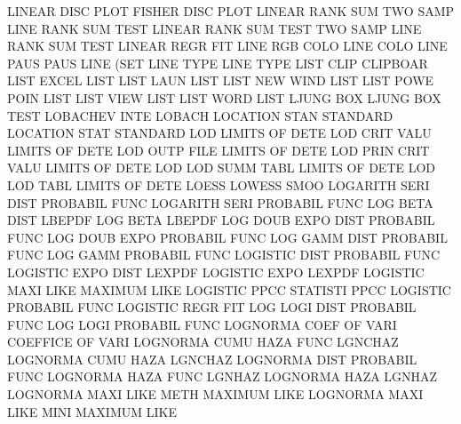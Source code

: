 LINEAR   DISC PLOT                      FISHER   DISC PLOT
LINEAR   RANK SUM                       TWO      SAMP LINE RANK SUM  TEST
LINEAR   RANK SUM  TEST                 TWO      SAMP LINE RANK SUM  TEST
LINEAR   REGR                           FIT
LINE     RGB  COLO                      LINE     COLO
LINE     PAUS                           PAUS     LINE (SET
LINE     TYPE                           LINE     TYPE
LIST     CLIP                           CLIPBOAR
LIST     EXCEL                          LIST
LIST     LAUN                           LIST
LIST     NEW  WIND                      LIST
LIST     POWE POIN                      LIST
LIST     VIEW                           LIST
LIST     WORD                           LIST
LJUNG    BOX                            LJUNG    BOX  TEST
LOBACHEV INTE                           LOBACH
LOCATION STAN                           STANDARD
LOCATION STAT                           STANDARD
LOD                                     LIMITS   OF   DETE
LOD      CRIT VALU                      LIMITS   OF   DETE
LOD      OUTP FILE                      LIMITS   OF   DETE
LOD      PRIN CRIT VALU                 LIMITS   OF   DETE
LOD      LOD  SUMM TABL                 LIMITS   OF   DETE
LOD      LOD  TABL                      LIMITS   OF   DETE
LOESS                                   LOWESS   SMOO
LOGARITH SERI DIST                      PROBABIL FUNC
LOGARITH SERI                           PROBABIL FUNC
LOG      BETA DIST                      LBEPDF
LOG      BETA                           LBEPDF
LOG      DOUB EXPO DIST                 PROBABIL FUNC
LOG      DOUB EXPO                      PROBABIL FUNC
LOG      GAMM DIST                      PROBABIL FUNC
LOG      GAMM                           PROBABIL FUNC
LOGISTIC DIST                           PROBABIL FUNC
LOGISTIC EXPO DIST                      LEXPDF
LOGISTIC EXPO                           LEXPDF
LOGISTIC MAXI LIKE                      MAXIMUM  LIKE
LOGISTIC PPCC                           STATISTI PPCC
LOGISTIC                                PROBABIL FUNC
LOGISTIC REGR                           FIT
LOG      LOGI DIST                      PROBABIL FUNC
LOG      LOGI                           PROBABIL FUNC
LOGNORMA COEF OF   VARI                 COEFFICE OF   VARI
LOGNORMA CUMU HAZA FUNC                 LGNCHAZ
LOGNORMA CUMU HAZA                      LGNCHAZ
LOGNORMA DIST                           PROBABIL FUNC
LOGNORMA HAZA FUNC                      LGNHAZ
LOGNORMA HAZA                           LGNHAZ
LOGNORMA MAXI LIKE METH                 MAXIMUM  LIKE
LOGNORMA MAXI LIKE MINI                 MAXIMUM  LIKE
